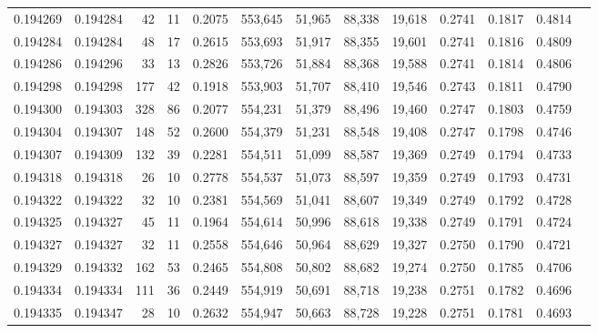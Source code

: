 \begin{tabular}{rrrrrrrrrrrrr}
0.194269 & 0.194284 &    42 &  11 &                                     0.2075 & 553,645 &  51,965 &  88,338 &  19,618 & 0.2741 & 0.1817 & 0.4814 \\
0.194284 & 0.194284 &    48 &  17 &                                     0.2615 & 553,693 &  51,917 &  88,355 &  19,601 & 0.2741 & 0.1816 & 0.4809 \\
0.194286 & 0.194296 &    33 &  13 &                                     0.2826 & 553,726 &  51,884 &  88,368 &  19,588 & 0.2741 & 0.1814 & 0.4806 \\
0.194298 & 0.194298 &   177 &  42 &                                     0.1918 & 553,903 &  51,707 &  88,410 &  19,546 & 0.2743 & 0.1811 & 0.4790 \\
0.194300 & 0.194303 &   328 &  86 &                                     0.2077 & 554,231 &  51,379 &  88,496 &  19,460 & 0.2747 & 0.1803 & 0.4759 \\
0.194304 & 0.194307 &   148 &  52 &                                     0.2600 & 554,379 &  51,231 &  88,548 &  19,408 & 0.2747 & 0.1798 & 0.4746 \\
0.194307 & 0.194309 &   132 &  39 &                                     0.2281 & 554,511 &  51,099 &  88,587 &  19,369 & 0.2749 & 0.1794 & 0.4733 \\
0.194318 & 0.194318 &    26 &  10 &                                     0.2778 & 554,537 &  51,073 &  88,597 &  19,359 & 0.2749 & 0.1793 & 0.4731 \\
0.194322 & 0.194322 &    32 &  10 &                                     0.2381 & 554,569 &  51,041 &  88,607 &  19,349 & 0.2749 & 0.1792 & 0.4728 \\
0.194325 & 0.194327 &    45 &  11 &                                     0.1964 & 554,614 &  50,996 &  88,618 &  19,338 & 0.2749 & 0.1791 & 0.4724 \\
0.194327 & 0.194327 &    32 &  11 &                                     0.2558 & 554,646 &  50,964 &  88,629 &  19,327 & 0.2750 & 0.1790 & 0.4721 \\
0.194329 & 0.194332 &   162 &  53 &                                     0.2465 & 554,808 &  50,802 &  88,682 &  19,274 & 0.2750 & 0.1785 & 0.4706 \\
0.194334 & 0.194334 &   111 &  36 &                                     0.2449 & 554,919 &  50,691 &  88,718 &  19,238 & 0.2751 & 0.1782 & 0.4696 \\
0.194335 & 0.194347 &    28 &  10 &                                     0.2632 & 554,947 &  50,663 &  88,728 &  19,228 & 0.2751 & 0.1781 & 0.4693 \\

\end{tabular}

